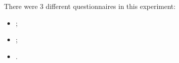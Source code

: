 There were 3 different questionnaires in this experiment:
\begin{itemize}
    \item {};
    \item {};
    \item {}.
\end{itemize}






